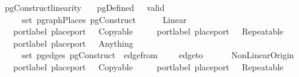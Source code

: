 \ pgConstruct{\isacharunderscore}linearity{\isacharcolon}\isanewline
\ \ \ {\isachardoublequoteopen}pgDefined\ \ \ {\isachardoublequoteopen}valid\ \isanewline
\ \ \ {\isachardoublequoteopen}\ {\isasymin}\ set\ {\isacharparenleft}pgraphPlaces\ {\isacharparenleft}pgConstruct\ \isanewline
\ \ \isanewline
\ \ \isaindent{\isacharbar\ }{\isacharparenleft}Linear{\isacharparenright}\isanewline
\ \ \ port{\isachardot}label\ {\isacharparenleft}place{\isacharunderscore}port\ \ {\isacharequal}\ Copyable\ \isanewline
\ \ \ {\isachardoublequoteopen}{\isasymnot}{\isacharparenleft}{\isasymexists}\ port{\isachardot}label\ {\isacharparenleft}place{\isacharunderscore}port\ \ {\isacharequal}\ Repeatable\ \isanewline
\ \ \ {\isachardoublequoteopen}port{\isachardot}label\ {\isacharparenleft}place{\isacharunderscore}port\ \ {\isasymnoteq}\ Anything{\isachardoublequoteclose}\isanewline
\ \ \ {\isachardoublequoteopen}{\isasymexists}{\isacharbang}\ {\isasymin}\ set\ {\isacharparenleft}pg{\isacharunderscore}edges\ {\isacharparenleft}pgConstruct\ \ edge{\isacharunderscore}from\ \ {\isacharequal}\ \ {\isasymor}\ edge{\isacharunderscore}to\ \ {\isacharequal}\ \isanewline
\ \ {\isacharbar}\ {\isacharparenleft}NonLinear{\isacharunderscore}Origin{\isacharparenright}\isanewline
\ \ \ port{\isachardot}label\ {\isacharparenleft}place{\isacharunderscore}port\ \ {\isacharequal}\ Copyable\ \ {\isasymor}\isanewline
\ \ \ port{\isachardot}label\ {\isacharparenleft}place{\isacharunderscore}port\ \ {\isacharequal}\ Repeatable\ \isanewline
